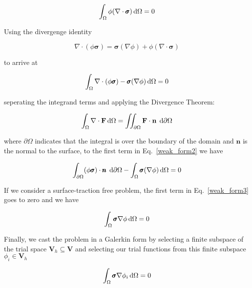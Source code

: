 %
\begin{equation}
\int_\Omega \phi(\nabla \cdot \pmb{\sigma}) \mathop{}\!\mathrm{d} \Omega = 0
\label{weak_form1}
\end{equation}
%

Using the divergenge identity 

%
\begin{equation}
\nabla \cdot (\phi \pmb{\sigma}) = \pmb{\sigma} (\nabla \phi) + \phi (\nabla \cdot \pmb{\sigma}) \nonumber
\end{equation}
%

to arrive at 

%
\begin{equation}
\int_\Omega \nabla \cdot (\phi \pmb{\sigma}) - \pmb{\sigma} (\nabla \phi) \mathop{}\!\mathrm{d} \Omega = 0
\label{weak_form2}
\end{equation}
%

seperating the integrand terms and applying the Divergence Theorem: 

%
\begin{equation}
\int_\Omega \nabla \cdot \textbf{F} \mathop{}\!\mathrm{d} \Omega = \iint_{\partial \Omega} \textbf{F} \cdot \textbf{n} \; \mathop{}\!\mathrm{d} \partial \Omega \nonumber
\end{equation}
%

where $\partial \Omega$ indicates that the integral is over the boundary of the domain and $\textbf{n}$ is the normal to the surface, to the first term in Eq.\ \eqref{weak_form2} we have

%
\begin{equation}
\int_{\partial \Omega} (\phi \pmb{\sigma}) \cdot \pmb{n} \; \mathop{}\!\mathrm{d} \partial \Omega - \int_\Omega \pmb{\sigma} (\nabla \phi) \mathop{}\!\mathrm{d} \Omega = 0
\label{weak_form3}
\end{equation}
%

If we consider a surface-traction free problem, the first term in Eq.\ \eqref{weak_form3} goes to zero and we have

%
\begin{equation}
\int_\Omega \pmb{\sigma} \nabla \phi \mathop{}\!\mathrm{d} \Omega = 0
\label{weak_form}
\end{equation}
%

Finally, we cast the problem in a Galerkin form by selecting a finite subspace of the trial space $\pmb{V}_h \subseteq \pmb{V}$ and selecting our trial functions from this finite subspace $\phi_i \in \pmb{V}_h$

%
\begin{equation}
\int_\Omega \pmb{\sigma} \nabla \phi_i \mathop{}\!\mathrm{d} \Omega = 0
\label{galerkin_weak_form}
\end{equation}
%

